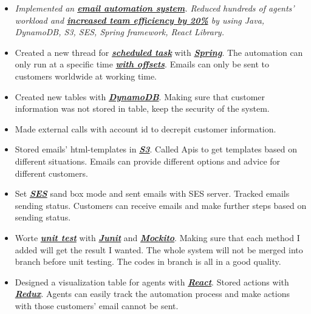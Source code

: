 \documentclass{article}
\begin{document}
\begin{itemize}
 \item[] \textit{Implemented an \textbf{\textit{\underline{email automation system}}}. Reduced hundreds of agents' workload and \textbf{\textit{\underline{increased team efficiency by 20\%}}} by using Java, DynamoDB, S3, SES, Spring framework, React Library. }
 
 \item Created a new thread for \textbf{\textit{\underline{scheduled task}}} with \textbf{\textit{\underline{Spring}}}. The automation can only run at a specific time \textbf{\textit{\underline{with offsets}}}. Emails can only be sent to customers worldwide at working time.
 
 \item Created new tables with \textbf{\textit{\underline{DynamoDB}}}. Making sure that customer information was not stored in table, keep the security of the system.
 
 \item Made external calls with account id to decrepit customer information.
 
 \item Stored emails' html-templates in \textbf{\textit{\underline{S3}}}. Called Apis to get templates based on different situations. Emails can provide different options and advice for different customers.
 
 \item Set \textbf{\textit{\underline{SES}}} sand box mode and sent emails with SES server. Tracked emails sending status. Customers can receive emails and make further steps based on sending status.
 
 \item Worte \textbf{\textit{\underline{unit test}}} with \textbf{\textit{\underline{Junit}}} and \textbf{\textit{\underline{Mockito}}}. Making sure that each method I added will get the result I wanted. The whole system will not be merged into branch before unit testing. The codes in branch is all in a good quality.
 
 \item Designed a visualization table for agents with \textbf{\textit{\underline{React}}}. Stored actions with \textbf{\textit{\underline{Redux}}}. Agents can easily track the automation process and make actions with those customers' email cannot be sent.
\end{itemize}
\end{document}
